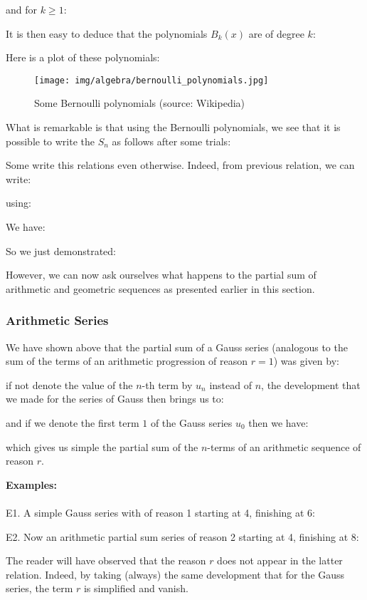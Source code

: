 	and for $k \geq 1$:
	
	It is then easy to deduce that the polynomials $B_k(x)$ are of degree $k$:
	
	Here is a plot of these polynomials:
	\begin{figure}[H]
		\centering
		\texttt{[image: img/algebra/bernoulli\_polynomials.jpg]}
		\caption{Some Bernoulli polynomials (source: Wikipedia)}
	\end{figure}
	What is remarkable is that using the Bernoulli polynomials, we see that it is possible to write the $S_n$ as follows after some trials:
	
	
	Some write this relations even otherwise. Indeed, from previous relation, we can write:
	
	using:
	
	We have:
	
	So we just demonstrated:
	
	
	
	However, we can now ask ourselves what happens to the partial sum of arithmetic and geometric sequences as presented earlier in this section.
	\subsubsection{Arithmetic Series}
	We have shown above that the partial sum of a Gauss series (analogous to the sum of the terms of an arithmetic progression of reason $r = 1$) was given by:
	
	if not denote the value of the $n$-th term by $u_n$ instead of $n$, the development that we made for the series of Gauss then brings us to:
	
	and if we denote the first term $1$ of the Gauss series $u_0$ then we have:
	
	which gives us simple the partial sum of the $n$-terms of an arithmetic sequence of reason $r$.
	\begin{tcolorbox}[colframe=black,colback=white,sharp corners]
	\textbf{{\Large {}}Examples:}\\\\
	E1. A simple Gauss series with of reason 1 starting at 4, finishing at 6:
	
	E2. Now an arithmetic partial sum series of reason 2 starting at 4, finishing at 8:
	
	\end{tcolorbox}
	\begin{tcolorbox}[title=Remarks,colframe=black,arc=10pt]
	The reader will have observed that the reason $r$ does not appear in the latter relation. Indeed, by taking (always) the same development that for the Gauss series, the term $r$ is simplified and vanish.
	\end{tcolorbox}
	

